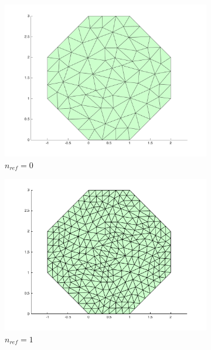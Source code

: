 \documentclass[10pt]{article}
\begin{document}
\begin{figure}[H]
        \centering
        \begin{subfigure}[b]{0.35\textwidth}
                \centering
                \includegraphics[width=\textwidth]{refine-A0.png}
                \caption{\(n_{ref}=0\)}
        \end{subfigure}%
        \begin{subfigure}[b]{0.35\textwidth}
                \centering
                \includegraphics[width=\textwidth]{refine-A1.png}
                \caption{\(n_{ref}=1\)}
        \end{subfigure}%
        \begin{subfigure}[b]{0.35\textwidth}
                \centering

\end{subfigure}
\end{figure}
\end{document}
